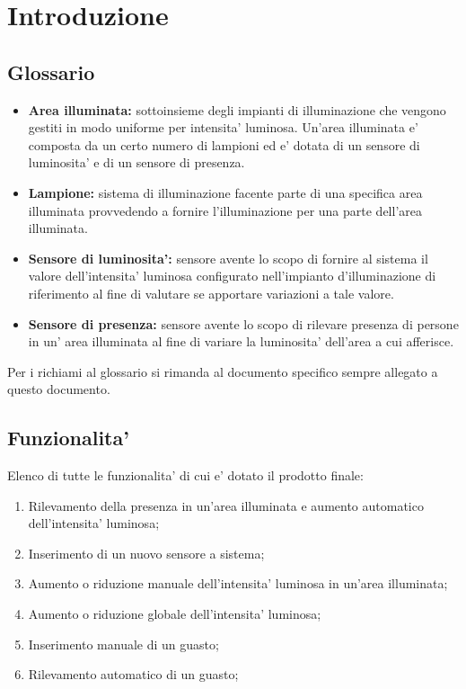 \chapter{Introduzione}

\section{Glossario}
\begin{itemize}
    \item \textbf{Area illuminata:} sottoinsieme degli impianti di illuminazione che vengono gestiti in
modo uniforme per intensita' luminosa. Un'area illuminata e' composta da un certo numero di lampioni ed e' dotata di un sensore 
di luminosita' e di un sensore di presenza.
    \item \textbf{Lampione:} sistema di illuminazione facente parte di una specifica area illuminata provvedendo a fornire 
    l'illuminazione per una parte dell'area illuminata.
    \item \textbf{Sensore di luminosita':} sensore avente lo scopo di fornire al sistema il valore dell'intensita' luminosa 
    configurato nell'impianto d'illuminazione di riferimento al fine di valutare se apportare variazioni a tale valore.
    \item \textbf{Sensore di presenza:} sensore avente lo scopo di rilevare presenza di persone in un' area illuminata al fine 
    di variare la luminosita' dell'area a cui afferisce.
\end{itemize}

Per i richiami al glossario si rimanda al documento specifico sempre allegato a questo documento.

\section{Funzionalita'}
Elenco di tutte le funzionalita' di cui e' dotato il prodotto finale:
\begin{enumerate}
    \item Rilevamento della presenza in un’area illuminata e aumento automatico dell’intensita' luminosa;
    \item Inserimento di un nuovo sensore a sistema;
    \item Aumento o riduzione manuale dell’intensita' luminosa in un’area illuminata;
    \item Aumento o riduzione globale dell’intensita' luminosa;
    \item Inserimento manuale di un guasto;
    \item Rilevamento automatico di un guasto;
\end{enumerate}
